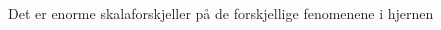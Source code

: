 \documentclass[presentation]{beamer}
\begin{document}
\begin{frame}{Det er enorme skalaforskjeller på de forskjellige fenomenene i hjernen}
\begin{columns}
\begin{column}{0.5\textwidth}
\begin{center}
         \end{center}
    \end{column}
    \end{columns}
\end{frame}
\end{document}
